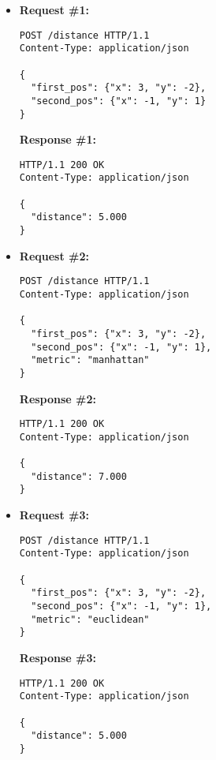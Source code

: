 \begin{itemize}
\item  %
\textbf{Request \#1:}
\begin{lstlisting}[xleftmargin=1pc,numbers=none]
POST /distance HTTP/1.1
Content-Type: application/json

{
  "first_pos": {"x": 3, "y": -2},
  "second_pos": {"x": -1, "y": 1}
}
\end{lstlisting}
\textbf{Response \#1:}
\begin{lstlisting}[xleftmargin=1pc,numbers=none]
HTTP/1.1 200 OK
Content-Type: application/json

{
  "distance": 5.000
}
\end{lstlisting}

\item  %
\textbf{Request \#2:}
\begin{lstlisting}[xleftmargin=1pc,numbers=none]
POST /distance HTTP/1.1
Content-Type: application/json

{
  "first_pos": {"x": 3, "y": -2},
  "second_pos": {"x": -1, "y": 1},
  "metric": "manhattan"
}
\end{lstlisting}
\newpage
\textbf{Response \#2:}
\begin{lstlisting}[xleftmargin=1pc,numbers=none]
HTTP/1.1 200 OK
Content-Type: application/json

{
  "distance": 7.000
}
\end{lstlisting}

\item  %
\textbf{Request \#3:}
\begin{lstlisting}[xleftmargin=1pc,numbers=none]
POST /distance HTTP/1.1
Content-Type: application/json

{
  "first_pos": {"x": 3, "y": -2},
  "second_pos": {"x": -1, "y": 1},
  "metric": "euclidean"
}
\end{lstlisting}
\textbf{Response \#3:}
\begin{lstlisting}[xleftmargin=1pc,numbers=none]
HTTP/1.1 200 OK
Content-Type: application/json

{
  "distance": 5.000
}
\end{lstlisting}
\end{itemize}
